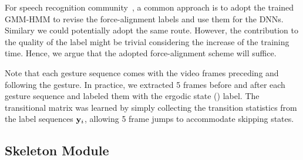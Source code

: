 For speech recognition community~\cite{yu2012automatic}, a common approach is to adopt the trained GMM-HMM to revise the force-alignment labels and use them for the DNNs. Similary we could potentially adopt the same route. However, the contribution to the quality of the label might be trivial considering the increase of the training time. Hence, we argue that the adopted force-alignment scheme will suffice.

Note that each gesture sequence comes with the video frames preceding and following the gesture.
In practice, we extracted 5 frames before and after each gesture sequence and labeled them
with the ergodic state (\ergodicstate) label.
%
The transitional matrix \transitionmatrix{} was learned by simply  collecting the transition statistics from the label sequences $\mathbf y_i$, allowing 5 frame jumps to accommodate skipping states.

%
%


\subsection{Skeleton Module}
\label{sec:skeleton_module}


%
%


